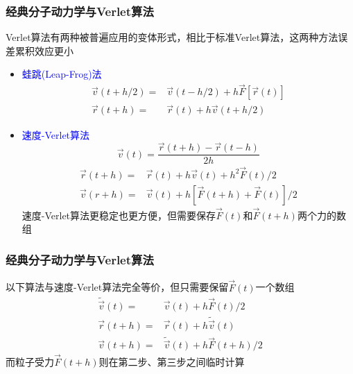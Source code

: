 {\frame
{
	\frametitle{经典分子动力学与\textrm{Verlet}算法}
	\textrm{Verlet}算法有两种被普遍应用的变体形式，相比于标准\textrm{Verlet}算法，这两种方法误差累积效应更小
	\begin{itemize}
		\item \textcolor{blue}{蛙跳(\textrm{Leap-Frog})法}
			\begin{displaymath}
				\begin{aligned}
					\vec v(t+h/2)=&\vec v(t-h/2)+h\vec F[\vec r(t)]\\
					\vec r(t+h)=&\vec r(t)+h\vec v(t+h/2)
				\end{aligned}
			\end{displaymath}
		\item \textcolor{blue}{速度-\textrm{Verlet}算法}
			\begin{displaymath}
				\vec v(t)=\dfrac{\vec r(t+h)-\vec r(t-h)}{2h}
			\end{displaymath}
			\begin{displaymath}
				\begin{aligned}
					\vec r(t+h)=&\vec r(t)+h\vec v(t)+h^2\vec F(t)/2\\
					\vec v(r+h)=&\vec v(t)+h[\vec F(t+h)+\vec F(t)]/2
				\end{aligned}
			\end{displaymath}
			速度-\textrm{Verlet}算法更稳定也更方便，但需要保存$\vec F(t)$和$\vec F(t+h)$两个力的数组
	\end{itemize}
}

\frame
{
	\frametitle{经典分子动力学与\textrm{Verlet}算法}
	以下算法与速度-\textrm{Verlet}算法完全等价，但只需要保留$\vec F(t)$一个数组
	\begin{displaymath}
		\begin{aligned}
			\tilde{\vec v}(t)=&\vec v(t)+h\vec F(t)/2\\
			\vec r(t+h)=&\vec r(t)+h\tilde{\vec v}(t)\\
			\vec v(t+h)=&\tilde{\vec v}(t)+h\vec F(t+h)/2
		\end{aligned}
	\end{displaymath}
	而粒子受力$\vec F(t+h)$则在第二步、第三步之间临时计算
\vskip 5pt
	{\fontsize{6.2pt}{4.2pt}}

}}

